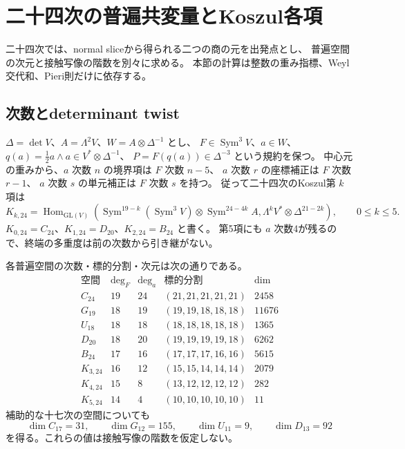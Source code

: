 

\section{二十四次の普遍共変量とKoszul各項}
\label{sec:v17-characters}

二十四次では、normal sliceから得られる二つの商の元を出発点とし、
普遍空間の次元と接触写像の階数を別々に求める。
本節の計算は整数の重み指標、Weyl交代和、Pieri則だけに依存する。

\subsection{次数とdeterminant twist}

$\Delta=\det V$、$A=\Lambda^2V$、$W=A\otimes\Delta^{-1}$ とし、
$F\in\operatorname{Sym}^3V$、$a\in W$、
$q(a)=\tfrac12a\wedge a\in V^*\otimes\Delta^{-1}$、
$P=F(q(a))\in\Delta^{-3}$ という規約を保つ。
中心元の重みから、$a$ 次数 $n$ の境界項は $F$ 次数 $n-5$、
$a$ 次数 $r$ の座標補正は $F$ 次数 $r-1$、
$a$ 次数 $s$ の単元補正は $F$ 次数 $s$ を持つ。
従って二十四次のKoszul第 $k$ 項は
\[
 K_{k,24}=\operatorname{Hom}_{\mathrm{GL}(V)}
 \left(\operatorname{Sym}^{19-k}(\operatorname{Sym}^3V)
 \otimes\operatorname{Sym}^{24-4k}A,
 \Lambda^kV^*\otimes\Delta^{21-2k}\right),\qquad 0\leq k\leq5.
\]
$K_{0,24}=C_{24}$、$K_{1,24}=D_{20}$、$K_{2,24}=B_{24}$ と書く。
第5項にも $a$ 次数4が残るので、終端の多重度は前の次数から引き継がない。

\begin{proposition}[二十四次の厳密次元]
\label{prop:v17-character-dimensions}
各普遍空間の次数・標的分割・次元は次の通りである。
\[
\begin{array}{c|r|r|c|r}
\text{空間}&\deg_F&\deg_a&\text{標的分割}&\dim\\\hline
C_{24}&19&24&(21,21,21,21,21)&2458\\
G_{19}&18&19&(19,19,18,18,18)&11676\\
U_{18}&18&18&(18,18,18,18,18)&1365\\
D_{20}&18&20&(19,19,19,19,18)&6262\\
B_{24}&17&16&(17,17,17,16,16)&5615\\
K_{3,24}&16&12&(15,15,14,14,14)&2079\\
K_{4,24}&15&8&(13,12,12,12,12)&282\\
K_{5,24}&14&4&(10,10,10,10,10)&11
\end{array}
\]
補助的な十七次の空間についても
\[
 \dim C_{17}=31,\qquad \dim G_{12}=155,\qquad
 \dim U_{11}=9,\qquad \dim D_{13}=92
\]
を得る。これらの値は接触写像の階数を仮定しない。
\end{proposition}

